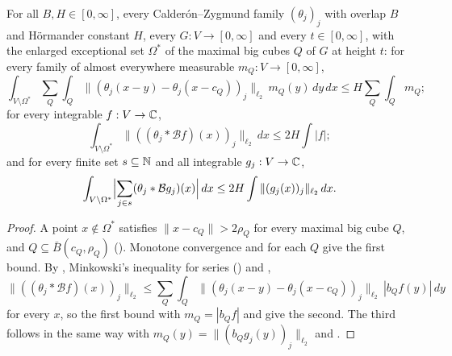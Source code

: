\begin{lemma}
\label{lem:bad-part-off-enlarged}
\leanok
{}
For all $B, H \in [0, \infty]$, every Calder\'on--Zygmund family $(\theta_j)_j$ with overlap
$B$ and H\"ormander constant $H$, every $G : V \to [0, \infty]$ and every $t \in [0, \infty]$,
with the enlarged exceptional set $\Omega^*$ of the maximal big cubes $Q$ of $G$ at height $t$:
for every family of almost everywhere measurable $m_Q : V \to [0, \infty]$,
\[
  \int_{V \setminus \Omega^*} \sum_Q \int_Q
  \|(\theta_j(x - y) - \theta_j(x - c_Q))_j\|_{\ell_2} \, m_Q(y) \, dy \, dx
  \leq H \sum_Q \int_Q m_Q ;
\]
for every integrable $f : V \to \mathbb{C}$,
\[
  \int_{V \setminus \Omega^*} \|((\theta_j * \mathcal B f)(x))_j\|_{\ell_2} \, dx
  \leq 2 H \int |f| ;
\]
and for every finite set $s \subseteq \mathbb{N}$ and all integrable $g_j : V \to \mathbb{C}$,
\[
  \int_{V \setminus \Omega^*} \Bigl|\sum_{j \in s} (\theta_j * \mathcal B g_j)(x)\Bigr| \, dx
  \leq 2 H \int \|(g_j(x))_j\|_{\ell_2} \, dx .
\]
\end{lemma}

\begin{proof}
\leanok
A point $x \notin \Omega^*$ satisfies $\|x - c_Q\| > 2\rho_Q$ for every maximal big cube $Q$,
and $Q \subseteq \bar B(c_Q, \rho_Q)$ (). Monotone convergence and
 for each $Q$ give the first bound. By ,
Minkowski's inequality for series () and
,
\[
  \|((\theta_j * \mathcal B f)(x))_j\|_{\ell_2}
  \leq \sum_Q \int_Q \|(\theta_j(x - y) - \theta_j(x - c_Q))_j\|_{\ell_2} \,
  |b_Q f(y)| \, dy
\]
for every $x$, so the first bound with $m_Q = |b_Q f|$ and
 give the second. The third follows in the same
way with $m_Q(y) = \|(b_Q g_j(y))_j\|_{\ell_2}$ and .
\end{proof}

